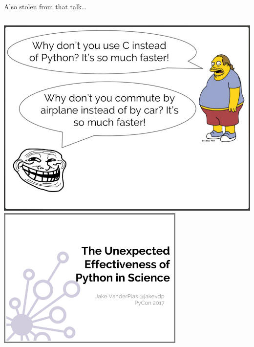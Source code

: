 \documentclass[aspectratio=169]{beamer}
\begin{document}
\begin{frame}{Also stolen from that talk\ldots}
\vspace{0.1 cm}
\begin{columns}[b]
\includegraphics[height=7.8 cm]{commute-by-plane.png}
\vspace{0.15 cm}
\includegraphics[width=\linewidth]{unreasonable-effectiveness.png}
\vspace{5.15 cm}
\end{columns}
\end{frame}
\end{document}
